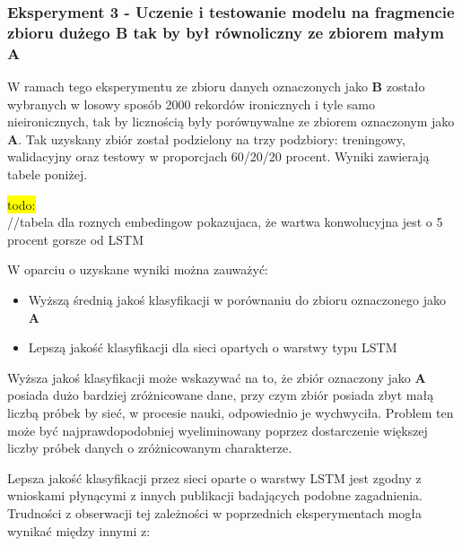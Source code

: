 \subsubsection{Eksperyment 3 - Uczenie i testowanie modelu na fragmencie zbioru dużego B tak by był równoliczny ze zbiorem małym A}

W ramach tego eksperymentu ze zbioru danych oznaczonych jako \textbf{B} zostało wybranych w losowy sposób 2000 rekordów ironicznych i tyle samo nieironicznych, tak by licznością były porównywalne ze zbiorem oznaczonym jako \textbf{A}. Tak uzyskany zbiór został podzielony na trzy podzbiory: treningowy, walidacyjny oraz testowy w proporcjach 60/20/20 procent. Wyniki zawierają tabele poniżej.

\colorbox{yellow}{todo:}\\
//tabela dla roznych embedingow pokazujaca, że wartwa konwolucyjna jest o 5 procent gorsze od LSTM


W oparciu o uzyskane wyniki można zauważyć:

\begin{itemize}
    \item Wyższą średnią jakoś klasyfikacji w porównaniu do zbioru oznaczonego jako \textbf{A}
    \item Lepszą jakość klasyfikacji dla sieci opartych o warstwy typu LSTM
\end{itemize}


Wyższa jakoś klasyfikacji może wskazywać na to, że zbiór oznaczony jako \textbf{A} posiada dużo bardziej zróżnicowane dane, przy czym zbiór posiada zbyt małą liczbą próbek by sieć, w procesie nauki, odpowiednio je wychwyciła. Problem ten może być najprawdopodobniej wyeliminowany poprzez dostarczenie większej liczby próbek danych o zróżnicowanym charakterze.

Lepsza jakość klasyfikacji przez sieci oparte o warstwy LSTM jest zgodny z wnioskami płynącymi z innych publikacji badających podobne zagadnienia. Trudności z obserwacji tej zależności w poprzednich eksperymentach mogła wynikać między innymi z:


